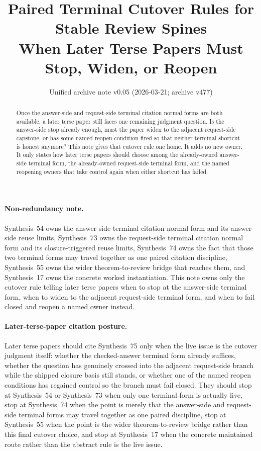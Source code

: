 \documentclass[11pt]{article}
\title{Paired Terminal Cutover Rules for Stable Review Spines\\
\large When Later Terse Papers Must Stop, Widen, or Reopen}
\author{}
\date{Unified archive note v0.05 (2026-03-21; archive v477)}
\begin{document}
\maketitle

\begin{abstract}
Once the answer-side and request-side terminal citation normal forms are both available, a later terse paper still faces one remaining judgment question.
Is the answer-side stop already enough, must the paper widen to the adjacent request-side capstone, or has some named reopen condition fired so that neither terminal shortcut is honest anymore?
This note gives that cutover rule one home.
It adds no new owner.
It only states how later terse papers should choose among the already-owned answer-side terminal form, the already-owned request-side terminal form, and the named reopening owners that take control again when either shortcut has failed.
\end{abstract}

\paragraph{Non-redundancy note.}
Synthesis~54 owns the answer-side terminal citation normal form and its answer-side reuse limits, Synthesis~73 owns the request-side terminal citation normal form and its closure-triggered reuse limits, Synthesis~74 owns the fact that those two terminal forms may travel together as one paired citation discipline, Synthesis~55 owns the wider theorem-to-review bridge that reaches them, and Synthesis~17 owns the concrete worked instantiation.\cite{series:challengeanswerreviewmenus,series:publicrequestresponsepacketrefreshresponsepacketclosureverdicts,series:pairedterminalcitationdiscipline,series:seriesspines,series:workedexample}
This note owns only the cutover rule telling later terse papers when to stop at the answer-side terminal form, when to widen to the adjacent request-side terminal form, and when to fail closed and reopen a named owner instead.

\paragraph{Later-terse-paper citation posture.}
Later terse papers should cite Synthesis~75 only when the live issue is the cutover judgment itself: whether the checked-answer terminal form already suffices, whether the question has genuinely crossed into the adjacent request-side branch while the shipped closure basis still stands, or whether one of the named reopen conditions has regained control so the branch must fail closed.
They should stop at Synthesis~54 or Synthesis~73 when only one terminal form is actually live, stop at Synthesis~74 when the point is merely that the answer-side and request-side terminal forms may travel together as one paired discipline, stop at Synthesis~55 when the point is the wider theorem-to-review bridge rather than this final cutover choice, and stop at Synthesis~17 when the concrete maintained route rather than the abstract rule is the live issue.
\end{document}
